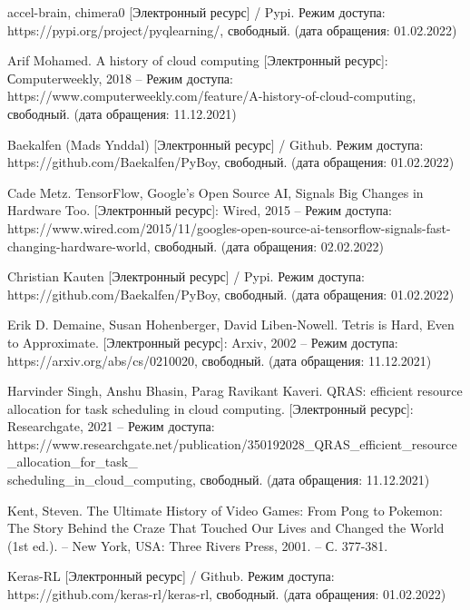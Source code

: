 \documentclass{article}
\begin{document}
\begin{center}
\begin{thebibliography}{}
 accel-brain, chimera0 [Электронный ресурс] / Pypi. Режим доступа: https://pypi.org/project/pyqlearning/, свободный. (дата обращения: 01.02.2022)

 Arif Mohamed. A history of cloud computing [Электронный ресурс]: Сomputerweekly, 2018 – Режим доступа: https://www.computerweekly.com/feature/A-history-of-cloud-computing, свободный. (дата обращения: 11.12.2021)

 Baekalfen (Mads Ynddal) [Электронный ресурс] / Github. Режим доступа: https://github.com/Baekalfen/PyBoy, свободный. (дата обращения: 01.02.2022)

 Cade Metz. TensorFlow, Google's Open Source AI, Signals Big Changes in Hardware Too. [Электронный ресурс]: Wired, 2015 – Режим доступа: https://www.wired.com/2015/11/googles-open-source-ai-tensorflow-signals-fast-changing-hardware-world, свободный. (дата обращения: 02.02.2022) 

 Christian Kauten [Электронный ресурс] / Pypi. Режим доступа: https://github.com/Baekalfen/PyBoy, свободный. (дата обращения: 01.02.2022)

 Erik D. Demaine, Susan Hohenberger, David Liben-Nowell. Tetris is Hard, Even to Approximate. [Электронный ресурс]: Arxiv, 2002 – Режим доступа: https://arxiv.org/abs/cs/0210020, свободный. (дата обращения: 11.12.2021)

 Harvinder Singh, Anshu Bhasin, Parag Ravikant Kaveri. QRAS: efficient resource allocation for task scheduling in cloud computing. [Электронный ресурс]: Researchgate, 2021 – Режим доступа: https://www.researchgate.net/publication/350192028\_QRAS\_efficient\_resource\_allocation\_for\_task\_\\scheduling\_in\_cloud\_computing, свободный. (дата обращения: 11.12.2021)

 Kent, Steven. The Ultimate History of Video Games: From Pong to Pokemon: The Story Behind the Craze That Touched Our Lives and Changed the World (1st ed.). – New York, USA: Three Rivers Press, 2001. – С. 377-381.

 Keras-RL [Электронный ресурс] / Github. Режим доступа: https://github.com/keras-rl/keras-rl, свободный. (дата обращения: 01.02.2022)


\end{thebibliography}
\end{center}
\end{document}
